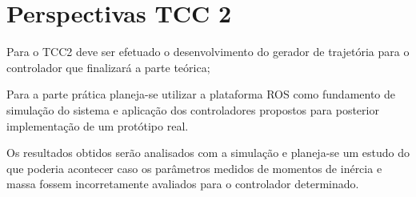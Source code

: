 \documentclass[main.tex]{subfiles}
\begin{document}
\chapter{Perspectivas TCC 2}\label{sec:perspectivas}

Para o TCC2 deve ser efetuado o desenvolvimento do gerador de trajetória para o controlador que finalizará a parte teórica;

Para a parte prática planeja-se utilizar a plataforma ROS como fundamento de simulação do sistema e aplicação dos controladores propostos para posterior implementação de um protótipo real.

Os resultados obtidos serão analisados com a simulação e planeja-se um estudo do que poderia acontecer caso os parâmetros medidos de momentos de inércia e massa fossem incorretamente avaliados para o controlador determinado.
\end{document}
